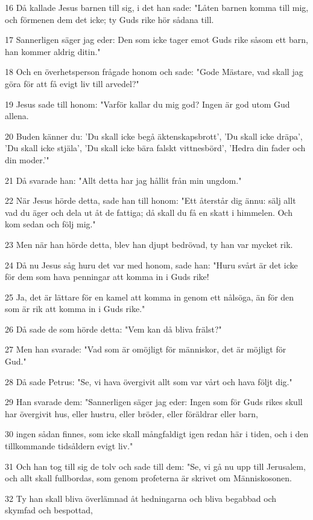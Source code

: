 \par 16 Då kallade Jesus barnen till sig, i det han sade: "Låten barnen komma till mig, och förmenen dem det icke; ty Guds rike hör sådana till.
\par 17 Sannerligen säger jag eder: Den som icke tager emot Guds rike såsom ett barn, han kommer aldrig ditin."
\par 18 Och en överhetsperson frågade honom och sade: "Gode Mästare, vad skall jag göra för att få evigt liv till arvedel?"
\par 19 Jesus sade till honom: "Varför kallar du mig god? Ingen är god utom Gud allena.
\par 20 Buden känner du: 'Du skall icke begå äktenskapsbrott', 'Du skall icke dräpa', 'Du skall icke stjäla', 'Du skall icke bära falskt vittnesbörd', 'Hedra din fader och din moder.'"
\par 21 Då svarade han: "Allt detta har jag hållit från min ungdom."
\par 22 När Jesus hörde detta, sade han till honom: "Ett återstår dig ännu: sälj allt vad du äger och dela ut åt de fattiga; då skall du få en skatt i himmelen. Och kom sedan och följ mig."
\par 23 Men när han hörde detta, blev han djupt bedrövad, ty han var mycket rik.
\par 24 Då nu Jesus såg huru det var med honom, sade han: "Huru svårt är det icke för dem som hava penningar att komma in i Guds rike!
\par 25 Ja, det är lättare för en kamel att komma in genom ett nålsöga, än för den som är rik att komma in i Guds rike."
\par 26 Då sade de som hörde detta: "Vem kan då bliva frälst?"
\par 27 Men han svarade: "Vad som är omöjligt för människor, det är möjligt för Gud."
\par 28 Då sade Petrus: "Se, vi hava övergivit allt som var vårt och hava följt dig."
\par 29 Han svarade dem: "Sannerligen säger jag eder: Ingen som för Guds rikes skull har övergivit hus, eller hustru, eller bröder, eller föräldrar eller barn,
\par 30 ingen sådan finnes, som icke skall mångfaldigt igen redan här i tiden, och i den tillkommande tidsåldern evigt liv."
\par 31 Och han tog till sig de tolv och sade till dem: "Se, vi gå nu upp till Jerusalem, och allt skall fullbordas, som genom profeterna är skrivet om Människosonen.
\par 32 Ty han skall bliva överlämnad åt hedningarna och bliva begabbad och skymfad och bespottad,
